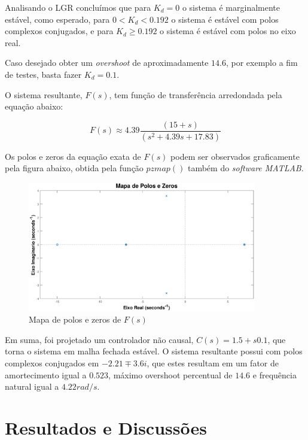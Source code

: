 \documentclass[conference,harvard,brazil,english]{sbatex}
\begin{document}
            Analisando o LGR concluímos que para $K_d=0$ o sistema é marginalmente estável, como esperado, para $0 < K_d < 0.192$ o sistema é estável com polos complexos conjugados, e para $ K_d \geq 0.192$ o sistema é estável com polos no eixo real.
            
            Caso desejado obter um \textit{overshoot} de aproximadamente $14.6$, por exemplo a fim de testes, basta fazer $K_d = 0.1$.
            
            O sistema resultante, $F(s)$, tem função de transferência arredondada pela equação abaixo:
            
            \begin{equation}
                F(s) \approx 4.39 \frac{(15+s)}
                {(s^2 + 4.39s + 17.83)}
            \end{equation}
            
            Os polos e zeros da equação exata de $F(s)$ podem ser observados graficamente pela figura abaixo, obtida pela função $pzmap()$ também do \textit{software MATLAB}.
            
            \begin{figure}[h]
                \hspace{-18mm}
                \includegraphics[width=10cm]{imagens/graficos/pzmap.eps}
                \caption{Mapa de polos e zeros de $F(s)$}
            \end{figure}
            
            Em suma, foi projetado um controlador não causal, $C(s) = 1.5 + s0.1$, que torna o sistema em malha fechada estável. O sistema resultante possui com polos complexos conjugados em $-2.21 \mp3.6i$, que estes resultam em um fator de amortecimento igual a $0.523$, máximo overshoot percentual de $14.6$ e frequência natural igual a $4.22rad/s$.
        
    \section{Resultados e Discussões}
    
\end{document}
